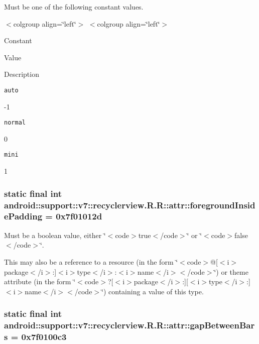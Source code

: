 Must be one of the following constant values. \begin{TabularC}{0}
\hline
\end{TabularC}
$<$colgroup align=\char`\"{}left\char`\"{}$>$ $<$colgroup align=\char`\"{}left\char`\"{}$>$ 

Constant

Value

Description 

{\tt auto}

-1

{\tt normal}

0

{\tt mini}

1\hypertarget{classandroid_1_1support_1_1v7_1_1recyclerview_1_1_r_1_1attr_5546f4abc9888aefb3dc13c33572d0a8}{
\subsubsection[{foregroundInsidePadding}]{\setlength{\rightskip}{0pt plus 5cm}static final int android::support::v7::recyclerview.R.R::attr::foregroundInsidePadding = 0x7f01012d}}
\label{classandroid_1_1support_1_1v7_1_1recyclerview_1_1_r_1_1attr_5546f4abc9888aefb3dc13c33572d0a8}


Must be a boolean value, either \char`\"{}$<$code$>$true$<$/code$>$\char`\"{} or \char`\"{}$<$code$>$false$<$/code$>$\char`\"{}. 

This may also be a reference to a resource (in the form \char`\"{}$<$code$>$@\mbox{[}$<$i$>$package$<$/i$>$:\mbox{]}$<$i$>$type$<$/i$>$:$<$i$>$name$<$/i$>$$<$/code$>$\char`\"{}) or theme attribute (in the form \char`\"{}$<$code$>$?\mbox{[}$<$i$>$package$<$/i$>$:\mbox{]}\mbox{[}$<$i$>$type$<$/i$>$:\mbox{]}$<$i$>$name$<$/i$>$$<$/code$>$\char`\"{}) containing a value of this type. \hypertarget{classandroid_1_1support_1_1v7_1_1recyclerview_1_1_r_1_1attr_b052be03c5a0c3e67be6babace94cb4a}{
\subsubsection[{gapBetweenBars}]{\setlength{\rightskip}{0pt plus 5cm}static final int android::support::v7::recyclerview.R.R::attr::gapBetweenBars = 0x7f0100c3}}
\label{classandroid_1_1support_1_1v7_1_1recyclerview_1_1_r_1_1attr_b052be03c5a0c3e67be6babace94cb4a}


